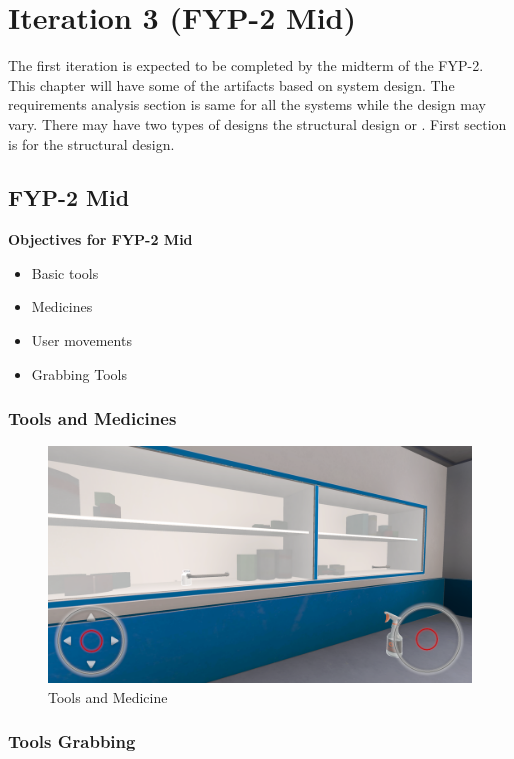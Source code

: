 \chapter{Iteration 3 (FYP-2 Mid)}
\label{ch:iter3}

The first iteration is expected to be completed by the midterm of the FYP-2.
This chapter will have some of the artifacts based on system design. The requirements analysis section is same for all the systems while the design may vary. There may have two types of designs the structural design or . First section is for the structural design.


\section{FYP-2 Mid}
\textbf{Objectives for FYP-2 Mid}
	\begin{itemize}
		\item Basic tools
		\item Medicines 
		\item User movements
		\item Grabbing Tools
	\end{itemize}
\newpage
\subsection{Tools and Medicines}
\begin{figure}[h]
	\centering
	\includegraphics[width=0.65\linewidth]{Images/Tools and Medicine.png}
	\caption{Tools and Medicine}
	\label{fig:system-diagram}
\end{figure}

\subsection{Tools Grabbing}
